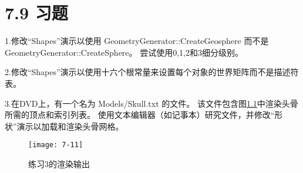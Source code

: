 \chapter{7.9 习题}
\begin{flushleft}
1.修改“Shapes”演示以使用 GeometryGenerator::CreateGeosphere 而不是 GeometryGenerator::CreateSphere。 尝试使用0,1,2和3细分级别。\\
\end{flushleft}

\begin{flushleft}
2.修改“Shapes”演示以使用十六个根常量来设置每个对象的世界矩阵而不是描述符表。\\
\end{flushleft}

\begin{flushleft}
3.在DVD上，有一个名为 Models/Skull.txt 的文件。 该文件包含图\ref{fig:7-11}中渲染头骨所需的顶点和索引列表。 使用文本编辑器（如记事本）研究文件，并修改“形状”演示以加载和渲染头骨网格。\\
\end{flushleft}

\begin{figure}[h]
    \texttt{[image: 7-11]}
    \centering
    \caption{练习3的渲染输出}
    \label{fig:7-11}
\end{figure}